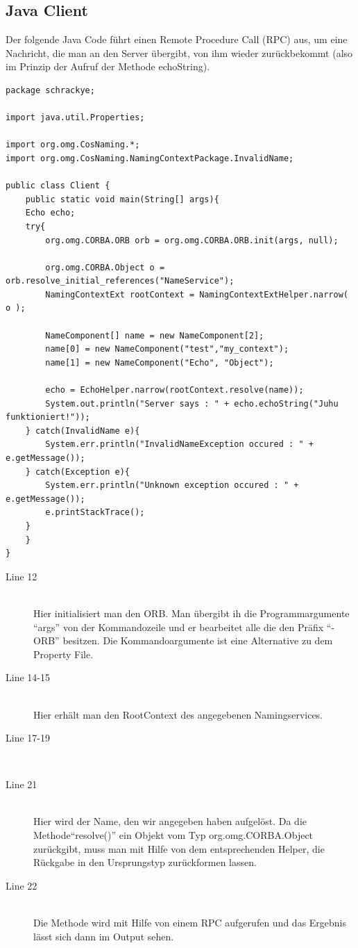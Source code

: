 \documentclass[11pt]{article}
\begin{document}
\subsection{Java Client}

Der folgende Java Code führt einen Remote Procedure Call (RPC) aus, um eine Nachricht, die man an den Server übergibt, von ihm wieder zurückbekommt (also im Prinzip der Aufruf der Methode echoString).

\begin{lstlisting}
package schrackye;

import java.util.Properties;

import org.omg.CosNaming.*;
import org.omg.CosNaming.NamingContextPackage.InvalidName;

public class Client {
    public static void main(String[] args){
	Echo echo;
	try{
	    org.omg.CORBA.ORB orb = org.omg.CORBA.ORB.init(args, null);

	    org.omg.CORBA.Object o = orb.resolve_initial_references("NameService");
	    NamingContextExt rootContext = NamingContextExtHelper.narrow( o );
			
	    NameComponent[] name = new NameComponent[2];
	    name[0] = new NameComponent("test","my_context");
	    name[1] = new NameComponent("Echo", "Object");
		
	    echo = EchoHelper.narrow(rootContext.resolve(name));
	    System.out.println("Server says : " + echo.echoString("Juhu funktioniert!"));
	} catch(InvalidName e){
	    System.err.println("InvalidNameException occured : " + e.getMessage());
	} catch(Exception e){
	    System.err.println("Unknown exception occured : " + e.getMessage());
	    e.printStackTrace();
	}
    }
}
\end{lstlisting}

\begin{description}
\item[Line 12] \hfill \\
Hier initialisiert man den ORB. Man übergibt ih die Programmargumente ``args'' von der Kommandozeile und er bearbeitet alle die den Präfix ``-ORB'' besitzen. Die Kommandoargumente ist eine Alternative zu dem Property File.

\item[Line 14-15] \hfill \\
Hier erhält man den RootContext des angegebenen Namingservices. 

\item[Line 17-19] \hfill \\

\item[Line 21] \hfill \\
Hier wird der Name, den wir angegeben haben aufgelöst. Da die Methode``resolve()'' ein Objekt vom Typ org.omg.CORBA.Object zurückgibt, muss man mit Hilfe von dem entsprechenden Helper, die Rückgabe in den Ursprungstyp zurückformen lassen.

\item[Line 22] \hfill \\
Die Methode wird mit Hilfe von einem RPC aufgerufen und das Ergebnis lässt sich dann im Output sehen.

\end{description}
\end{document}
